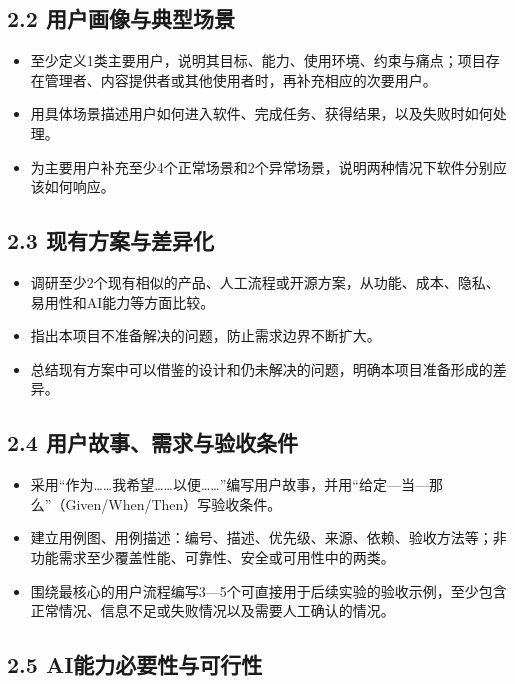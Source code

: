 \documentclass[UTF8,12pt,a4paper]{ctexart}
\begin{document}
\subsection*{2.2 用户画像与典型场景}

\begin{itemize}
  \item 至少定义1类主要用户，说明其目标、能力、使用环境、约束与痛点；项目存在管理者、内容提供者或其他使用者时，再补充相应的次要用户。
  \item 用具体场景描述用户如何进入软件、完成任务、获得结果，以及失败时如何处理。
  \item 为主要用户补充至少4个正常场景和2个异常场景，说明两种情况下软件分别应该如何响应。
\end{itemize}

\subsection*{2.3 现有方案与差异化}

\begin{itemize}
  \item 调研至少2个现有相似的产品、人工流程或开源方案，从功能、成本、隐私、易用性和AI能力等方面比较。
  \item 指出本项目不准备解决的问题，防止需求边界不断扩大。
  \item 总结现有方案中可以借鉴的设计和仍未解决的问题，明确本项目准备形成的差异。
\end{itemize}

\subsection*{2.4 用户故事、需求与验收条件}

\begin{itemize}
  \item 采用“作为……我希望……以便……”编写用户故事，并用“给定—当—那么”（Given/When/Then）写验收条件。
  \item 建立用例图、用例描述：编号、描述、优先级、来源、依赖、验收方法等；非功能需求至少覆盖性能、可靠性、安全或可用性中的两类。
  \item 围绕最核心的用户流程编写3—5个可直接用于后续实验的验收示例，至少包含正常情况、信息不足或失败情况以及需要人工确认的情况。
\end{itemize}

\subsection*{2.5 AI能力必要性与可行性}
\end{document}
